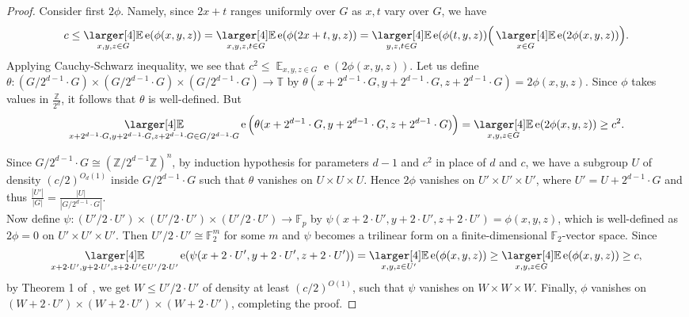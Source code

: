 \documentclass[a4paper,11pt]{article}
\numberwithin{theorem}{section}
\theoremstyle{definition}
\newcommand{\on}[1]{
	\operatorname{#1}
}
\newcommand\ex{\mathop{\mathbb{E}}}
\newcommand{\exx}{
  \mathop{
    \mathchoice{\vcenter{\hbox{\larger[4]$\mathbb{E}$}}}
               {\kern0pt\mathbb{E}}
               {\kern0pt\mathbb{E}}
               {\kern0pt\mathbb{E}}
  }\displaylimits
}
\begin{document}
\begin{proof}
    Consider first $2\phi$. Namely, since $2x + t$ ranges uniformly over $G$ as $x,t$ vary over $G$, we have
    \[c \leq \exx_{x,y,z \in G} \on{e}(\phi(x,y,z)) = \exx_{x,y,z, t \in G} \on{e}(\phi(2x + t,y,z)) = \exx_{y,z,t \in G}  \on{e}(\phi(t,y,z))\Big(\exx_{x \in G} \on{e}(2\phi(x,y,z))\Big).\]
    Applying Cauchy-Schwarz inequality, we see that $c^2 \leq \ex_{x,y,z \in G} \on{e}(2\phi(x,y,z))$. Let us define $\theta : (G / 2^{d-1}\cdot G) \times (G / 2^{d-1}\cdot G) \times (G / 2^{d-1}\cdot G) \to \mathbb{T}$ by $\theta(x + 2^{d-1}\cdot G, y + 2^{d-1}\cdot G, z + 2^{d-1}\cdot G) = 2\phi(x,y,z)$. Since $\phi$ takes values in $\frac{\mathbb{Z}}{2^d}$, it follows that $\theta$ is well-defined. But
    \[\exx_{x+ 2^{d-1}\cdot G,y+ 2^{d-1}\cdot G,z + 2^{d-1}\cdot G\in G/ 2^{d-1}\cdot G}\on{e}\Big(\theta(x + 2^{d-1}\cdot G, y + 2^{d-1}\cdot G, z + 2^{d-1}\cdot G)\Big) = \exx_{x,y,z \in G} \on{e}(2\phi(x,y,z)) \geq c^2.\]

    Since $G/2^{d-1} \cdot G \cong (\mathbb{Z}/2^{d-1}\mathbb{Z})^n$, by induction hypothesis for parameters $d-1$ and $c^2$ in place of $d$ and $c$, we have a subgroup $U$ of density $(c/2)^{O_d(1)}$ inside $G/2^{d-1} \cdot G$ such that $\theta$ vanishes on $U \times U \times U$. Hence $2\phi$ vanishes on $U' \times U' \times U'$, where $U' = U + 2^{d-1} \cdot G$ and thus $\frac{|U'|}{|G|} = \frac{|U|}{|G/2^{d-1} \cdot G|}$.\\ 

    Now define $\psi : (U' /2 \cdot U') \times (U' /2 \cdot U') \times (U' /2 \cdot U') \to \mathbb{F}_p$ by $\psi(x + 2 \cdot U', y + 2 \cdot U', z + 2 \cdot U') = \phi(x,y,z)$, which is well-defined as $2\phi = 0$ on $U' \times U' \times U'$. Then $U' /2 \cdot U' \cong \mathbb{F}_2^m$ for some $m$ and $\psi$ becomes a trilinear form on a finite-dimensional $\mathbb{F}_2$-vector space. Since 
    \[\exx_{x + 2 \cdot U', y + 2 \cdot U', z + 2 \cdot U' \in U'/2 \cdot U'} \on{e}(\psi(x + 2 \cdot U', y + 2 \cdot U', z + 2 \cdot U')) = \exx_{x,y,z \in U'} \on{e}(\phi(x,y,z)) \geq \exx_{x,y,z \in G} \on{e}(\phi(x,y,z)) \geq c,\]
    by Theorem 1 of~\cite{CohenMosh}, we get $W \leq U' /2 \cdot U'$ of density at least $(c/2)^{O(1)}$, such that $\psi$ vanishes on $W \times W \times W$. Finally, $\phi$ vanishes on $(W + 2 \cdot U') \times (W + 2 \cdot U') \times (W + 2 \cdot U')$, completing the proof.
\end{proof}
\end{document}
